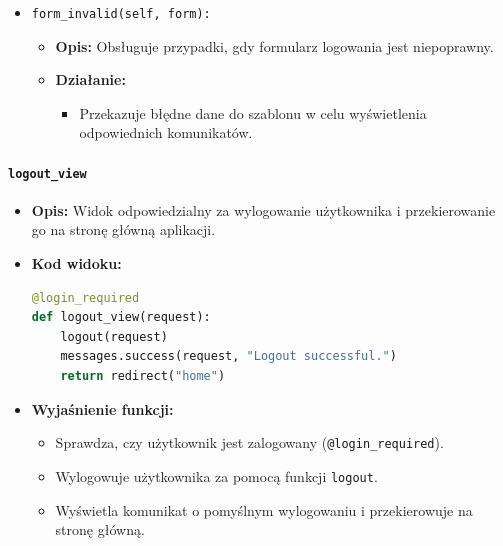 \documentclass[12pt,a4paper,oneside]{article}
\theoremstyle{definition}
\numberwithin{equation}{section}
\begin{document}
\begin{itemize}
\begin{itemize}
        \item \texttt{form\_invalid(self, form):}
        \begin{itemize}
            \item \textbf{Opis:} Obsługuje przypadki, gdy formularz logowania jest niepoprawny.
            \item \textbf{Działanie:}
            \begin{itemize}
                \item Przekazuje błędne dane do szablonu w celu wyświetlenia odpowiednich komunikatów.
            \end{itemize}
        \end{itemize}
    \end{itemize}
\end{itemize}

\paragraph{\texttt{logout\_view}}
\begin{itemize}
    \item \textbf{Opis:} Widok odpowiedzialny za wylogowanie użytkownika i przekierowanie go na stronę główną aplikacji.
    \item \textbf{Kod widoku:}
    \begin{lstlisting}[language=Python, caption=Widok logout\_view]
@login_required
def logout_view(request):
    logout(request)
    messages.success(request, "Logout successful.")
    return redirect("home")
    \end{lstlisting}

    \item \textbf{Wyjaśnienie funkcji:}
    \begin{itemize}
        \item Sprawdza, czy użytkownik jest zalogowany (\texttt{@login\_required}).
        \item Wylogowuje użytkownika za pomocą funkcji \texttt{logout}.
        \item Wyświetla komunikat o pomyślnym wylogowaniu i przekierowuje na stronę główną.
    \end{itemize}
\end{itemize}
\end{document}
